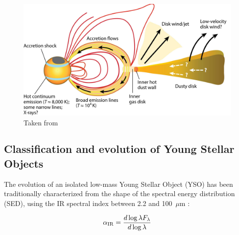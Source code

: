 \documentclass[12pt]{mythesis}
\begin{document}
\begin{figure}[h!] 
	\begin{center}
		\includegraphics[width=\textwidth]{figures/hartmann2016.png}
		\caption[Outflow and jet scheme]{Taken from \citet{hartmann2016}}
	        \label{fig:accretion}
	\end{center}
\end{figure}

\subsection{Classification and evolution of Young Stellar Objects}
The evolution of an isolated low-mass Young Stellar Object (YSO) has been traditionally characterized from the shape of the spectral energy distribution (SED), using the IR spectral index between 2.2 and 100~$\mu$m \citep{andre2000, dunham2014b}:

\begin{equation}
	\alpha_{\rm IR} = \frac{d\log\lambda F_\lambda}{d \log\lambda}
\end{equation}
\end{document}
